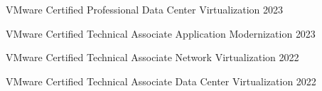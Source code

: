 



\begin{cvhonors}

  \cvhonor
    {VMware Certified Professional} %
    {Data Center Virtualization} %
    {} %
    {2023} %

  \cvhonor
    {VMware Certified Technical Associate} %
    {Application Modernization} %
    {} %
    {2023} %

  \cvhonor
    {VMware Certified Technical Associate} %
    {Network Virtualization} %
    {} %
    {2022} %

  \cvhonor
    {VMware Certified Technical Associate} %
    {Data Center Virtualization} %
    {} %
    {2022} %


\end{cvhonors}




